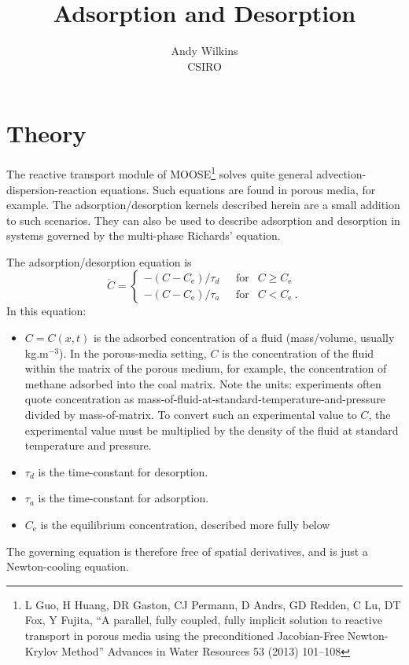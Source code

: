 \documentclass[]{scrreprt}
\begin{document}
\title{Adsorption and Desorption}
\author{Andy Wilkins \\
CSIRO}
\maketitle

\tableofcontents

\chapter{Theory}

The reactive transport module of MOOSE\footnote{L Guo, H Huang, DR
  Gaston, CJ Permann, D Andrs, GD Redden, C Lu, DT Fox, Y Fujita, ``A
  parallel, fully coupled, fully implicit solution to reactive
  transport in porous media using the preconditioned Jacobian-Free
  Newton-Krylov Method'' Advances in Water Resources 53 (2013)
  101--108} solves quite general advection-dispersion-reaction
equations.  Such equations are found in porous media, for example.  The
adsorption/desorption kernels described herein are a small addition to
such scenarios.  They can also be used to describe adsorption and
desorption in systems governed by the multi-phase Richards' equation.

The adsorption/desorption equation is
\begin{equation}
\dot{C} = \left\{
\begin{array}{ll}
-(C - C_{\mathrm{e}})/\tau_{d} & \ \ \ \mbox{for } \ \ C\geq C_{\mathrm{e}} \\
-(C - C_{\mathrm{e}})/\tau_{a} & \ \ \ \mbox{for } \ \ C < C_{\mathrm{e}}
\ .
\end{array}
\right.
\label{eqn.adde}
\end{equation}
In this equation:
\begin{itemize}
\item $C = C(x,t)$ is the adsorbed concentration of a fluid (mass/volume,
  usually kg.m$^{-3}$).  In the porous-media setting, $C$ is the
  concentration of the fluid within the matrix of the
  porous medium, for example, the concentration of methane adsorbed
  into the coal matrix.   Note the units: experiments often quote
  concentration as mass-of-fluid-at-standard-temperature-and-pressure
  divided by mass-of-matrix.  To convert such an experimental value to
  $C$, the experimental value must be multiplied by the density of the
  fluid at standard temperature and pressure.
\item $\tau_{d}$ is the time-constant for desorption.
\item $\tau_{a}$ is the time-constant for adsorption.
\item $C_{\mathrm{e}}$ is the equilibrium concentration, described
  more fully below
\end{itemize}
The governing equation is therefore free of spatial derivatives, and
is just a Newton-cooling equation.
\end{document}
